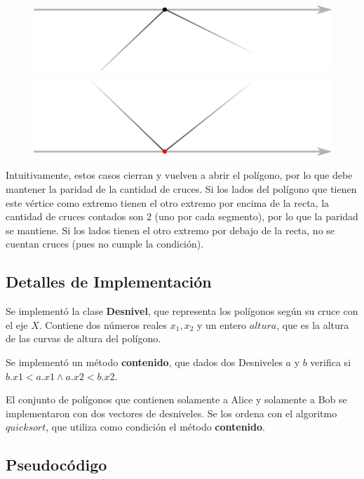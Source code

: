 \begin{itemize}
\begin{figure}[H]
\centering
\label{w_4y5}
\includegraphics[scale=0.8]{./figuras/w_4.png}
\includegraphics[scale=0.8]{./figuras/w_5.png}
\end{figure}

Intuitivamente, estos casos cierran y vuelven a abrir el polígono, por lo que debe mantener la paridad de
la cantidad de cruces. Si los lados del polígono que tienen este vértice como extremo tienen el otro extremo
por encima de la recta, la cantidad de cruces contados son 2 (uno por cada segmento), por lo que la paridad se
mantiene. Si los lados tienen el otro extremo por debajo de la recta, no se cuentan cruces (pues no cumple
la condición).
\end{itemize}

\subsection*{Detalles de Implementación}

Se implementó la clase \textbf{Desnivel}, que representa los polígonos según su cruce con el eje $X$.
Contiene dos números reales $x_1,x_2$ y un entero $altura$, que es la altura de las curvas de altura
del polígono.

Se implementó un método \textbf{contenido}, que dados dos Desniveles $a$ y $b$ verifica si
$b.x1 < a.x1 \wedge a.x2 < b.x2$.

El conjunto de polígonos que contienen solamente a Alice y solamente a Bob se
implementaron con dos vectores de desniveles. Se los ordena con el algoritmo
$quicksort$, que utiliza como condición el método \textbf{contenido}.

\subsection*{Pseudocódigo}


